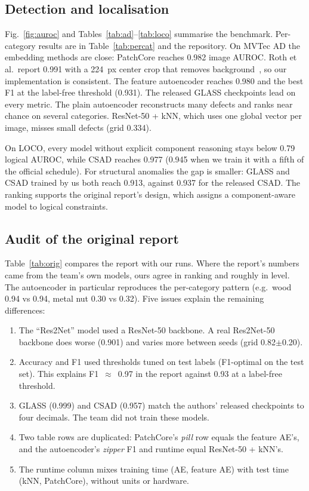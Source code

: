 \documentclass[conference]{IEEEtran}
\begin{document}
\subsection{Detection and localisation}
Fig.~\ref{fig:auroc} and Tables~\ref{tab:ad}--\ref{tab:loco} summarise the benchmark. Per-category results are in
Table~\ref{tab:percat} and the repository. On MVTec AD the embedding methods are close: PatchCore reaches 0.982
image AUROC. Roth et al.\ report 0.991 with a 224~px center crop that removes background~\cite{roth2022patchcore},
so our implementation is consistent. The feature autoencoder reaches 0.980 and the best F1 at the label-free
threshold (0.931). The released GLASS checkpoints lead on every metric. The plain autoencoder reconstructs many
defects and ranks near chance on several categories. ResNet-50 + kNN, which uses one global vector per image, misses
small defects (grid 0.334).

On LOCO, every model without explicit component reasoning stays below 0.79 logical AUROC, while CSAD reaches 0.977
(0.945 when we train it with a fifth of the official schedule). For structural anomalies the gap is smaller: GLASS
and CSAD trained by us both reach 0.913, against 0.937 for the released CSAD. The ranking
supports the original report's design, which assigns a component-aware model to logical constraints.

\subsection{Audit of the original report}\label{sec:audit}
Table~\ref{tab:orig} compares the report with our runs. Where the report's numbers came from the team's own
models, ours agree in ranking and roughly in level. The autoencoder in particular reproduces the per-category
pattern (e.g.\ wood 0.94 vs 0.94, metal nut 0.30 vs 0.32). Five issues explain the remaining differences:
\begin{enumerate}
\item The ``Res2Net'' model used a ResNet-50 backbone. A real Res2Net-50 backbone does worse (0.901) and varies
more between seeds (grid 0.82$\pm$0.20).
\item Accuracy and F1 used thresholds tuned on test labels (F1-optimal on the test set). This explains
F1~$\approx$~0.97 in the report against 0.93 at a label-free threshold.
\item GLASS (0.999) and CSAD (0.957) match the authors' released checkpoints to four decimals. The team did not
train these models.
\item Two table rows are duplicated: PatchCore's \emph{pill} row equals the feature AE's, and the autoencoder's
\emph{zipper} F1 and runtime equal ResNet-50 + kNN's.
\item The runtime column mixes training time (AE, feature AE) with test time (kNN, PatchCore), without units or
hardware.
\end{enumerate}
\end{document}
